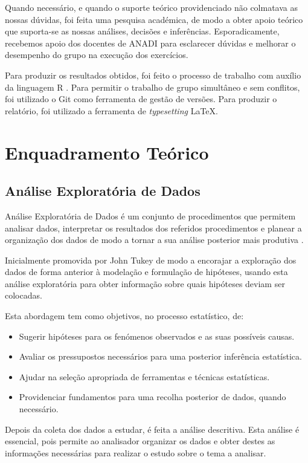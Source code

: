 \documentclass[conference]{IEEEtran}
\begin{document}
Quando necessário, e quando o suporte teórico providenciado não colmatava as nossas dúvidas, foi feita uma pesquisa académica, de modo a obter apoio teórico que suporta-se as nossas análises, decisões e inferências. Esporadicamente, recebemos apoio dos docentes de ANADI para esclarecer dúvidas e melhorar o desempenho do grupo na execução dos exercícios. 

Para produzir os resultados obtidos, foi feito o processo de trabalho com auxílio da linguagem R \cite{rlang}. Para permitir o trabalho de grupo simultâneo e sem conflitos, foi utilizado o Git \cite{trovalds} como ferramenta de gestão de versões. Para produzir o relatório, foi utilizado a ferramenta de \textit{typesetting} \LaTeX.


\section{Enquadramento Teórico}

\subsection{Análise Exploratória de Dados}

Análise Exploratória de Dados é um conjunto de procedimentos que permitem analisar dados, interpretar os resultados dos referidos procedimentos e planear a organização dos dados de modo a tornar a sua análise posterior mais produtiva \cite{Tukey_1962}.

Inicialmente promovida por John Tukey de modo a encorajar a exploração dos dados de forma anterior à modelação e formulação de hipóteses, usando esta análise exploratória para obter informação sobre quais hipóteses deviam ser colocadas.

Esta abordagem tem como objetivos, no processo estatístico, de:

\begin{itemize}
    \item Sugerir hipóteses para os fenómenos observados e as suas possíveis causas.
    \item Avaliar os pressupostos necessários para uma posterior inferência estatística.
    \item Ajudar na seleção apropriada de ferramentas e técnicas estatísticas.
    \item Providenciar fundamentos para uma recolha posterior de dados, quando necessário.
\end{itemize}


Depois da coleta dos dados a estudar, é feita a análise descritiva. Esta análise é essencial, pois permite ao analisador organizar os dados e obter destes as informações necessárias para realizar o estudo sobre o tema a analisar.
\end{document}
